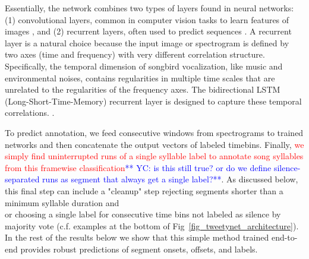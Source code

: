 \documentclass[10pt,letterpaper]{article}
\begin{document}
Essentially, the network combines two types of layers found in neural networks:(1) convolutional layers, common in computer vision tasks to learn features of images \cite{goodfellow_deep_2016,farabet_learning_2013,krizhevsky_imagenet_2012}, and (2) recurrent layers, often used to predict sequences \cite{graves_supervised_2012}. A recurrent layer is a natural choice because the input image or spectrogram is defined by two axes (time and frequency) with very different correlation structure.  Specifically, the temporal dimension of songbird vocalization, like music and environmental noises, contains regularities in multiple time scales that are unrelated to the regularities of the frequency axes. The bidirectional LSTM (Long-Short-Time-Memory) recurrent layer is designed to capture these temporal correlations. \cite{bock_polyphonic_2012-1,parascandolo_recurrent_2016}. 

To predict annotation, we feed consecutive windows from spectrograms to trained networks and
then concatenate the output vectors of labeled timebins. 
Finally, \textcolor{red}{we simply find uninterrupted runs of a single syllable label to annotate song syllables from this framewise classification}\textcolor{blue}{** YC: is this still true? or do we define silence- separated runs as segment that always get a single label?**}. As discussed below, this final step can include a "cleanup" step rejecting segments shorter than a minimum syllable duration and\\or choosing a single label for consecutive time bins not labeled as silence by majority vote (c.f. examples at the bottom of Fig~\ref{fig_tweetynet_architecture}). In the rest of the results below we show that this simple method trained end-to-end 
provides robust predictions of segment onsets, offsets, and labels.
\end{document}
